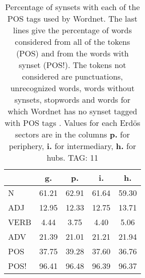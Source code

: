 \begin{table}[h!]
\begin{center}
\begin{tabular}{| l | c | c | c | c |}\hline
 & g. & p. & i. & h. \\\hline
N & 61.21  & 62.91  & 61.64  & 59.30 \\\hline
ADJ & 12.95  & 12.33  & 12.75  & 13.71 \\\hline
VERB & 4.44  & 3.75  & 4.40  & 5.06 \\\hline
ADV & 21.39  & 21.01  & 21.21  & 21.94 \\\hline
POS & 37.75  & 39.28  & 37.60  & 36.76 \\\hline
POS! & 96.41  & 96.48  & 96.39  & 96.37 \\\hline
\end{tabular}
\caption{Percentage of synsets with each of the POS tags used by Wordnet. The last lines give the percentage of words considered from all of the tokens (POS) and from the words with synset (POS!). The tokens not considered are punctuations, unrecognized words, words without synsets, stopwords and words for which Wordnet has no synset  tagged with POS tags . Values for each Erd\"os sectors are in the columns {{\bf p.}} for periphery, {{\bf i.}} for intermediary, {{\bf h.}} for hubs. TAG: 11}
\end{center}
\end{table}